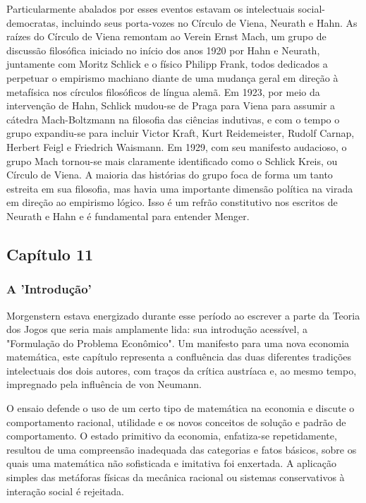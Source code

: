 \documentclass[12pt]{article}
\begin{document}
Particularmente abalados por esses eventos estavam os intelectuais social-democratas, incluindo seus porta-vozes no Círculo de Viena, Neurath e Hahn. As raízes do Círculo de Viena remontam ao Verein Ernst Mach, um grupo de discussão filosófica iniciado no início dos anos 1920 por Hahn e Neurath, juntamente com Moritz Schlick e o físico Philipp Frank, todos dedicados a perpetuar o empirismo machiano diante de uma mudança geral em direção à metafísica nos círculos filosóficos de língua alemã. Em 1923, por meio da intervenção de Hahn, Schlick mudou-se de Praga para Viena para assumir a cátedra Mach-Boltzmann na filosofia das ciências indutivas, e com o tempo o grupo expandiu-se para incluir Victor Kraft, Kurt Reidemeister, Rudolf Carnap, Herbert Feigl e Friedrich Waismann. Em 1929, com seu manifesto audacioso, o grupo Mach tornou-se mais claramente identificado como o Schlick Kreis, ou Círculo de Viena. A maioria das histórias do grupo foca de forma um tanto estreita em sua filosofia, mas havia uma importante dimensão política na virada em direção ao empirismo lógico. Isso é um refrão constitutivo nos escritos de Neurath e Hahn e é fundamental para entender Menger.

\subsection{\textbf{Capítulo 11}}
\subsubsection{\textbf{A 'Introdução'}}

Morgenstern estava energizado durante esse período ao escrever a parte da Teoria dos Jogos que seria mais amplamente lida: sua introdução acessível, a "Formulação do Problema Econômico". Um manifesto para uma nova economia matemática, este capítulo representa a confluência das duas diferentes tradições intelectuais dos dois autores, com traços da crítica austríaca e, ao mesmo tempo, impregnado pela influência de von Neumann.

O ensaio defende o uso de um certo tipo de matemática na economia e discute o comportamento racional, utilidade e os novos conceitos de solução e padrão de comportamento. O estado primitivo da economia, enfatiza-se repetidamente, resultou de uma compreensão inadequada das categorias e fatos básicos, sobre os quais uma matemática não sofisticada e imitativa foi enxertada. A aplicação simples das metáforas físicas da mecânica racional ou sistemas conservativos à interação social é rejeitada.
\end{document}
